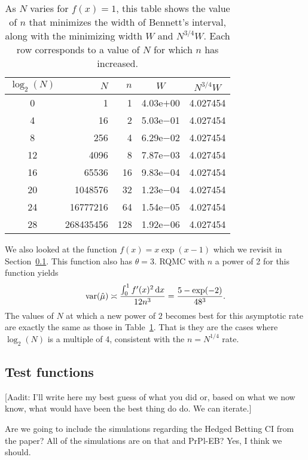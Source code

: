 \documentclass{article}
\newcommand{\art}[1]{\begingroup\color{blue}#1\endgroup}
\newcommand{\aadit}[1]{\begingroup\color{orange}#1\endgroup}
\newcommand{\rd}{\,\mathrm{d}}
\newcommand{\phz}{\phantom{0}}
\begin{document}
\begin{table}\centering
\begin{tabular}{crrcc}
\toprule
      $\log_2(N)$&        $N$ &  $n$ & $W$ & $N^{3/4}W$\\
\midrule
  \phz0&         1 &  1 &4.03e$+$00 &4.027454\\
  \phz4&        16 &  2 &5.03e$-$01 &4.027454\\
  \phz8&       256 &  4 &6.29e$-$02 &4.027454\\
 12&      4096 &  8 &7.87e$-$03 &4.027454\\
 16&     65536 & 16 &9.83e$-$04 &4.027454\\
 20&   1048576 & 32 &1.23e$-$04 &4.027454\\
 24&  16777216 & 64 &1.54e$-$05 &4.027454\\
 28& 268435456 &128 &1.92e$-$06 &4.027454\\
 \bottomrule
\end{tabular}
\caption{\label{tab:smoothcase}
As $N$ varies for $f(x)=1$, this table shows the
value of $n$ that minimizes the width of Bennett's
interval, along with the minimizing width $W$
and $N^{3/4}W$. Each row corresponds to a value of $N$
for which $n$ has increased.}
\end{table}

We also looked at the function $f(x)=x\exp(x-1)$
which we revisit in Section~\ref{sec:testfns}.
This function also has $\theta=3$. RQMC with $n$
a power of 2 for this function yields
$$
\var(\hat\mu)\asymp \frac{\int_0^1 f'(x)^2\rd x}{12n^3}
= \frac{5-\exp(-2)}{48^3}.
$$
The values of $N$ at which a new power of $2$
becomes best for this asymptotic rate are exactly
the same as those in Table~\ref{tab:smoothcase}.
That is they are the cases where $\log_2(N)$ is
a multiple of 4, consistent with the $n=N^{1/4}$
rate.  %


\subsection{Test functions}\label{sec:testfns}

\art{[Aadit: I'll write here my best guess of what you did
or, based on what we now know, what would have been the 
best thing do do.  We can iterate.]}

\aadit{Are we going to include the simulations regarding the Hedged Betting CI from the paper? All of the simulations are on that and PrPl-EB?}
\art{Yes, I think we should.}
\end{document}
